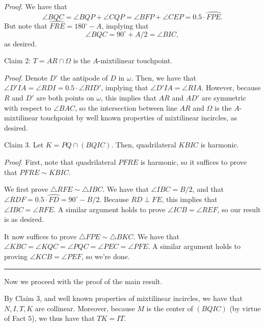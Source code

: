 \begin{solution}
\textit{Proof.} We have that 
\[\angle{BQC} = \angle{BQP} + \angle{CQP} = \angle{BFP} + \angle{CEP} = 0.5\cdot \wideparen{FPE}.\]
But note that $\wideparen{FRE} = 180^{\circ}-A$, implying that 
\[\angle{BQC} = 90^{\circ}+A/2 = \angle{BIC},\]
as desired.\V

\begin{claim}
Claim 2: $T = AR\cap \Omega$ is the $A$-mixtilinear touchpoint.
\end{claim}\V

\textit{Proof.} Denote $D'$ the antipode of $D$ in $\omega$. Then, we have that $\angle{D'IA} = \angle{RDI} = 0.5\cdot \angle{RID'}$, implying that $\angle{D'IA} = \angle{RIA}$. However, because $R$ and $D'$ are both points on $\omega$, this implies that $AR$ and $AD'$ are symmetric with respect to $\angle{BAC}$, so the intersection between line $AR$ and $\Omega$ is the $A$-mixtilinear touchpoint by well known properties of mixtilinear incircles, as desired.\V

\begin{claim}
Claim 3. Let $K = PQ\cap (BQIC)$. Then, quadrilateral $KBIC$ is harmonic.
\end{claim}\V

\textit{Proof.} First, note that quadrilateral $PFRE$ is harmonic, so it suffices to prove that $PFRE\sim KBIC$. \V

We first prove $\triangle{RFE}\sim \triangle{IBC}$. We have that $\angle{IBC} = B/2$, and that $\angle{RDF} = 0.5\cdot \wideparen{FD} = 90^{\circ}-B/2$. Because $RD\perp FE$, this implies that $\angle{IBC} = \angle{RFE}$. A similar argument holds to prove $\angle{ICB} = \angle{REF}$, so our result is as desired.\V

It now suffices to prove $\triangle{FPE} \sim \triangle{BKC}$. We have that $\angle{KBC} = \angle{KQC} = \angle{PQC} = \angle{PEC} = \angle{PFE}$. A similar argument holds to proving $\angle{KCB} = \angle{PEF}$, so we're done. 

\V\rule{\textwidth}{0.3pt} \vspace{0.3cm}

Now we proceed with the proof of the main result. \V

By Claim 3, and well known properties of mixtilinear incircles, we have that $N,I,T,K$ are collinear. Moreover, because $M$ is the center of $(BQIC)$ (by virtue of Fact $5$), we thus have that $TK=IT$.\V


\end{solution}
